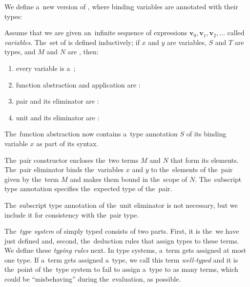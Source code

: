 We define a~new version of \lts, where binding variables are annotated with
their types:
\begin{definition}\label{def:stlc}
  Assume that we are given an~infinite sequence of expressions $\mathbf{v}_0,
  \mathbf{v}_1, \mathbf{v}_2, \dots$ called \emph{variables}. The~set of
  \emph{\lts} is defined inductively; if $x$ and $y$ are variables, $S$ and $T$
  are types, and $M$ and $N$ are \lts, then:
  \begin{enumerate}
    \item every variable is a~\lt;
    \item function abstraction and application are \lts:
    \item \label{def:stlc:let_item} pair and its eliminator are \lts:
    \item unit and its eliminator are \lts:
  \end{enumerate}
\end{definition}
The~function abstraction now contains a~type annotation $S$ of its binding
variable $x$ as part of its syntax.

The~pair constructor encloses the~two terms $M$ and $N$ that form its elements.
The~pair eliminator binds the~variables $x$ and $y$ to the~elements of the~pair
given by the~term $M$ and makes them bound in the~scope of $N$. The~subscript
type annotation specifies the~expected type of the~pair.

The~subscript type annotation of the~unit eliminator is not necessary, but we
include it for consistency with the~pair type.

The~\emph{type system} of simply typed \lc consists of two parts. First, it is
the~\lts we have just defined and, second, the~deduction rules that assign types
to these terms. We define these \emph{typing rules} next. In type systems,
a~term gets assigned at most one type. If a~term gets assigned a~type, we call
this term \emph{well-typed} and it is the~point of the~type system to fail to
assign a~type to as many terms, which could be ``misbehaving'' during
the~evaluation, as possible.

